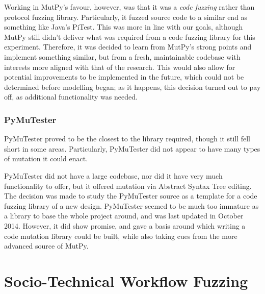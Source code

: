 \documentclass{sig-alternate}
\begin{document}
Working in MutPy's favour, however, was that it was a \emph{code fuzzing} rather than protocol fuzzing library. Particularly, it fuzzed source code to a similar end as something like Java's PiTest\cite{coles14pitest}. This was more in line with our goals, although MutPy still didn't deliver what was required from a code fuzzing library for this experiment. Therefore, it was decided to learn from MutPy's strong points and implement something similar, but from a fresh, maintainable codebase with interests more aligned with that of the research. This would also allow for potential improvements to be implemented in the future, which could not be determined before modelling began; as it happens, this decision turned out to pay off, as additional functionality was needed. \par

\subsubsection{PyMuTester}
\label{fuzzing_pymutester}
PyMuTester\cite{PyMutTester} proved to be the closest to the library required, though it still fell short in some areas. Particularly, PyMuTester did not appear to have many types of mutation it could enact. \par
PyMuTester did not have a large codebase\cite{PyMutTester}, nor did it have very much functionality to offer, but it offered mutation via Abstract Syntax Tree editing. The decision was made to study the PyMuTester source as a template for a code fuzzing library of a new design. PyMuTester seemed to be much too immature as a library to base the whole project around, and was last updated in October 2014. However, it did show promise, and gave a basis around which writing a code mutation library could be built, while also taking cues from the more advanced source of MutPy\cite{khala8:online}.  \par%



\section{Socio-Technical Workflow Fuzzing}

\end{document}
